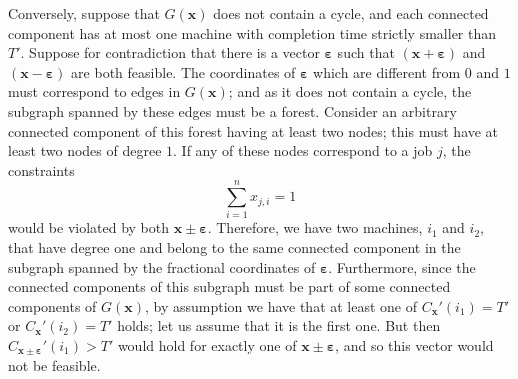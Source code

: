 \documentclass[moor,sglanonrev]{informs4}
\theoremstyle{plain}
\begin{document}
\begin{APPENDICES}
    Conversely, suppose that $G(\bm{x})$ does not contain a cycle, and each connected component has at most one machine with completion time strictly smaller than $T'$. Suppose for contradiction that there is a vector $\bm{\varepsilon}$ such that $(\bm{x} + \bm{\varepsilon})$ and $(\bm{x} - \bm{\varepsilon})$ are both feasible. The coordinates of $\bm{\varepsilon}$ which are different from $0$ and $1$ must correspond to edges in $G(\bm{x})$; and as it does not contain a cycle, the subgraph spanned by these edges must be a forest. Consider an arbitrary connected component of this forest having at least two nodes; this must have at least two nodes of degree $1$. If any of these nodes correspond to a job $j$, the constraints 
    \[
    \sum\limits_{i=1}^n x_{j,i} = 1
    \]
    would be violated by both $\bm{x}\pm \bm{\varepsilon}$. Therefore, we have two machines, $i_1$ and $i_2$, that have degree one and belong to the same connected component in the subgraph spanned by the fractional coordinates of $\bm{\varepsilon}$. Furthermore, since the connected components of this subgraph must be part of some connected components of $G(\bm{x})$, by assumption we have that at least one of $C_{\bm{x}}'(i_1) = T'$ or $C_{\bm{x}}'(i_2) = T'$ holds; let us assume that it is the first one. But then $C_{\bm{x}\pm\bm{\varepsilon}}'(i_1) > T'$ would hold for exactly one of $\bm{x}\pm\bm{\varepsilon}$, and so this vector would not be feasible. \hfill \Halmos




\end{APPENDICES}
\end{document}
